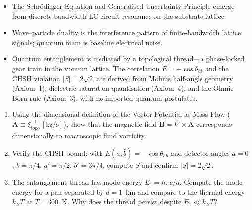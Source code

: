 \begin{summarybox}
\begin{itemize}
    \item The Schr\"odinger Equation and Generalised Uncertainty Principle emerge from discrete-bandwidth LC circuit resonance on the substrate lattice.
    \item Wave--particle duality is the interference pattern of finite-bandwidth lattice signals; quantum foam is baseline electrical noise.
    \item Quantum entanglement is mediated by a topological thread---a phase-locked gear train in the vacuum lattice. The correlation $E = -\cos\theta_{ab}$ and the CHSH violation $|S| = 2\sqrt{2}$ are derived from M\"obius half-angle geometry (Axiom~1), dielectric saturation quantisation (Axiom~4), and the Ohmic Born rule (Axiom~3), with no imported quantum postulates.
\end{itemize}
\end{summarybox}

\begin{exercisebox}
\begin{enumerate}
    \item Using the dimensional definition of the Vector Potential as Mass Flow ($\mathbf{A} \equiv \xi_{topo}^{-1}\, [\text{kg/s}]$), show that the magnetic field $\mathbf{B} = \nabla \times \mathbf{A}$ corresponds dimensionally to macroscopic fluid vorticity.
    \item Verify the CHSH bound: with $E(\hat{a},\hat{b}) = -\cos\theta_{ab}$ and detector angles $a=0$, $b=\pi/4$, $a'=\pi/2$, $b'=3\pi/4$, compute $S$ and confirm $|S| = 2\sqrt{2}$.
    \item The entanglement thread has mode energy $E_1 = \hbar\pi c/d$. Compute the mode energy for a pair separated by $d = 1$~km and compare to the thermal energy $k_BT$ at $T = 300$~K. Why does the thread persist despite $E_1 \ll k_BT$?
\end{enumerate}
\end{exercisebox}
